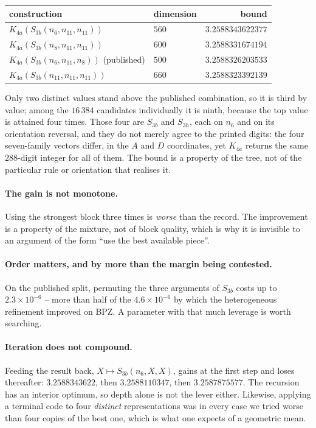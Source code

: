 \documentclass[11pt]{article}
\theoremstyle{definition}
\begin{document}
\begin{center}
\begin{tabular}{llr}
\toprule
construction & dimension & bound \\
\midrule
$K_{4a}(S_{3b}(n_6, n_{11}, n_{11}))$ & $560$ & $3.2588343622377$ \\
$K_{4a}(S_{3b}(n_8, n_{11}, n_{11}))$ & $600$ & $3.2588331674194$ \\
$K_{4a}(S_{3b}(n_6, n_{11}, n_8))$ (published) & $500$ & $3.2588326203533$ \\
$K_{4a}(S_{3b}(n_{11}, n_{11}, n_{11}))$ & $660$ & $3.2588323392139$ \\
\bottomrule
\end{tabular}
\end{center}

Only two distinct values stand above the published combination, so it is third by value; among
the $16\,384$ candidates individually it is ninth, because the top value is attained four times.
Those four are $S_{3b}$ and $S_{3h}$, each on $n_6$ and on its orientation reversal, and they do not
merely agree to the printed digits: the four seven-family vectors differ, in the $A$ and $D$
coordinates, yet $K_{4a}$ returns the same $288$-digit integer for all of them. The bound is a
property of the tree, not of the particular rule or orientation that realises it.

\paragraph{The gain is not monotone.}
Using the strongest block three times is \emph{worse} than the record. The improvement is a
property of the mixture, not of block quality, which is why it is invisible to an argument of the
form ``use the best available piece''.

\paragraph{Order matters, and by more than the margin being contested.}
On the published split, permuting the three arguments of $S_{3b}$ costs up to
$2.3 \times 10^{-6}$ -- more than half of the $4.6 \times 10^{-6}$ by which the heterogeneous
refinement improved on BPZ. A parameter with that much leverage is worth searching.

\paragraph{Iteration does not compound.}
Feeding the result back, $X \mapsto S_{3b}(n_6, X, X)$, gains at the first step and loses
thereafter: $3.2588343622$, then $3.2588110347$, then $3.2587875577$. The recursion has an
interior optimum, so depth alone is not the lever either. Likewise, applying a terminal code to
four \emph{distinct} representations was in every case we tried worse than four copies of the
best one, which is what one expects of a geometric mean.
\end{document}
